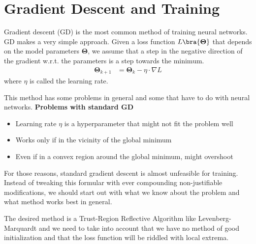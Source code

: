 \chapter{Gradient Descent and Training}
Gradient descent (GD) is the most common method of training neural networks. GD makes a very simple approach. Given a loss function $L\bra{\boldsymbol{\Theta}}$ that depends on the model parameters $\boldsymbol{\Theta}$, we assume that a step in the negative direction of the gradient w.r.t. the parameters is a step towards the minimum.
\begin{align}
	\label{eq:gradient-descent}
	\boldsymbol{\Theta}_{k+1}&=\boldsymbol{\Theta}_k - \eta\cdot\nabla L
\end{align}
where $\eta$ is called the learning rate.\par
This method has some problems in general and some that have to do with neural networks. 
\textbf{Problems with standard GD}
\begin{itemize}
	\item Learning rate $\eta$ is a hyperparameter that might not fit the problem well
	\item Works only if in the vicinity of the global minimum
	\item Even if in a convex region around the global minimum, might overshoot
\end{itemize}
For those reasons, standard gradient descent is almost unfeasible for training. Instead of tweaking this formular with ever compounding non-justifiable modifications, we should start out with what we know about the problem and what method works best in general.\par
The desired method is a Trust-Region Reflective Algorithm like Levenberg-Marquardt and we need to take into account that we have no method of good initialization and that the loss function will be riddled with local extrema.
